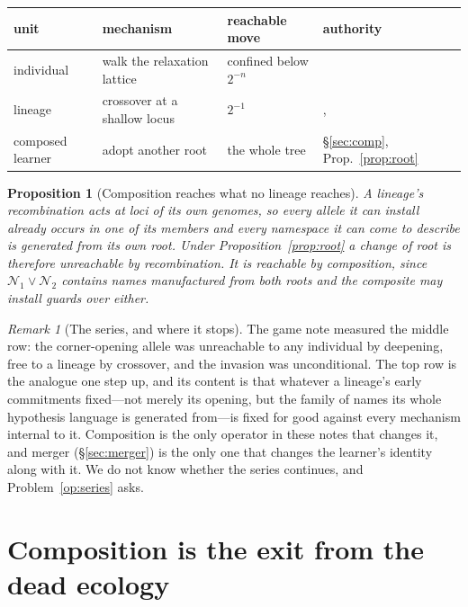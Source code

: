 \documentclass[11pt,a4paper]{article}
\theoremstyle{plain}
\newtheorem{proposition}[theorem]{Proposition}
\theoremstyle{definition}
\theoremstyle{remark}
\newtheorem{remark}[theorem]{Remark}
\newcommand{\Nsp}{\mathcal{N}}
\begin{document}
\begin{table}[h]
\centering
\small
\begin{tabular}{@{}llll@{}}
\toprule
unit & mechanism & reachable move & authority \\
\midrule
individual & walk the relaxation lattice & confined below $2^{-n}$ &
  \cite[Prop.~13]{scientist} \\
lineage & crossover at a shallow locus & $2^{-1}$ &
  \cite[\S12.10]{scientist}, \cite[\S9.3]{game} \\
composed learner & adopt another root & the whole tree &
  \S\ref{sec:comp}, Prop.~\ref{prop:root} \\
\bottomrule
\end{tabular}
\end{table}

\begin{proposition}[Composition reaches what no lineage reaches]
A lineage's recombination acts at loci of its own genomes, so every allele it can install already
occurs in one of its members and every namespace it can come to describe is generated from its own
root. Under Proposition~\ref{prop:root} a change of root is therefore unreachable by
recombination. It is reachable by composition, since $\Nsp_1 \vee \Nsp_2$ contains names
manufactured from both roots and the composite may install guards over either.
\end{proposition}

\begin{remark}[The series, and where it stops]
The game note measured the middle row: the corner-opening allele was unreachable to any
individual by deepening, free to a lineage by crossover, and the invasion was unconditional. The
top row is the analogue one step up, and its content is that whatever a lineage's early
commitments fixed---not merely its opening, but the family of names its whole hypothesis language
is generated from---is fixed for good against every mechanism internal to it. Composition is the
only operator in these notes that changes it, and merger (\S\ref{sec:merger}) is the only one
that changes the learner's identity along with it. We do not know whether the series continues,
and Problem~\ref{op:series} asks.
\end{remark}

\section{Composition is the exit from the dead ecology}
\end{document}
